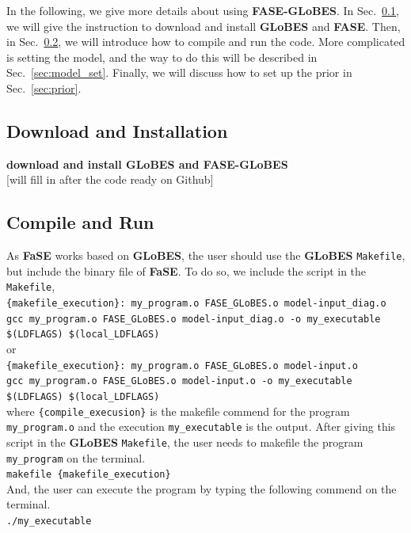 \documentclass[aps,prd,nofootinbib,preprint]{revtex4}
\begin{document}
In the following, we give more details about using \textbf{FASE-GLoBES}. In Sec.~\ref{sec:download}, we will give the instruction to download and install \textbf{GLoBES} and \textbf{FASE}. Then, in Sec.~\ref{sec:compile}, we will introduce how to compile and run the code. More complicated is setting the model, and the way to do this will be described in Sec.~\ref{sec:model_set}. Finally, we will discuss how to set up the prior in Sec.~\ref{sec:prior}.


\subsection{Download and Installation}\label{sec:download}
\textbf{download and install GLoBES and FASE-GLoBES}\\
{\color{red}[will fill in after the code ready on Github]}

\subsection{Compile and Run}\label{sec:compile}
As \textbf{FaSE} works based on \textbf{GLoBES}, the user should use the \textbf{GLoBES} \texttt{Makefile}, but include the binary file of \textbf{FaSE}. To do so, we include the script in the \texttt{Makefile},\vspace{0.2cm}\\
\texttt{\{makefile\_execution\}: my\_program.o  FASE\_GLoBES.o model-input\_diag.o\\
	gcc my\_program.o  FASE\_GLoBES.o model-input\_diag.o -o my\_executable  \$(LDFLAGS) \$(local\_LDFLAGS)}\\
or\\
\texttt{\{makefile\_execution\}: my\_program.o  FASE\_GLoBES.o model-input.o\\
	gcc my\_program.o  FASE\_GLoBES.o model-input.o -o my\_executable  \$(LDFLAGS) \$(local\_LDFLAGS)}\vspace{0.2cm}\\	
where \texttt{\{compile\_execusion\}} is the makefile commend for the program \texttt{my\_program.o} and the execution \texttt{my\_executable} is the output. After giving this script in the \textbf{GLoBES} \texttt{Makefile}, the user needs to makefile the program \texttt{my\_program} on the terminal.\vspace{0.2cm}\\
\texttt{makefile \{makefile\_execution\}}\vspace{0.2cm}\\
And, the user can execute the program by typing the following commend on the terminal.\vspace{0.2cm}\\ 
\texttt{./my\_executable}\vspace{0.2cm}\\
\end{document}
